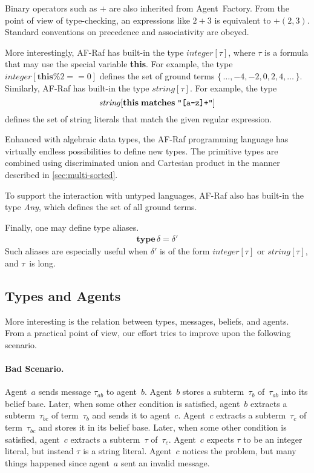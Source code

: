 \documentclass[preprint]{sigplanconf} %
\theoremstyle{remark}
\begin{document}
Binary operators such as $+$ are also inherited from Agent~Factory. From
the point of view of type-checking, an expressions like $2+3$ is equivalent
to $+(2,3)$. Standard conventions on precedence and associativity are
obeyed.

More interestingly, AF-Raf has built-in the type $\mathit{integer}[\tau]$,
where $\tau$ is a formula that may use the special variable \textbf{this}.
For example, the type $\mathit{integer}[\mathbf{this}\%2==0]$ defines the
set of ground terms $\{\,\ldots,-4,-2,0,2,4,\ldots\,\}$. Similarly, AF-Raf
has built-in the type $\mathit{string}[\tau]$. For example, the type
\[\mathit{string}[\mathbf{this}\;\mathbf{matches}\;\verb|"[a-z]+"|]\]
defines the set of string literals that match the given regular expression.

Enhanced with algebraic data types, the AF-Raf programming language has
virtually endless possibilities to define new types. The primitive types
are combined using discriminated union and Cartesian product in the manner
described in \autoref{sec:multi-sorted}.

To support the interaction with untyped languages, AF-Raf also has built-in
the type \textit{Any}, which defines the set of all ground terms.

Finally, one may define type aliases.
\begin{align}
\mathbf{type}\,\delta=\delta'
\end{align}
Such aliases are especially useful when $\delta'$ is of the form
$\mathit{integer}[\tau]$ or $\mathit{string}[\tau]$, and $\tau$~is long.

\subsection{Types and Agents}

More interesting is the relation between types, messages, beliefs, and
agents. From a practical point of view, our effort tries to improve upon
the following scenario.

\paragraph{Bad Scenario.}

Agent~$a$ sends message $\tau_{ab}$ to agent~$b$. Agent~$b$ stores a
subterm~$\tau_b$ of~$\tau_{ab}$ into its belief base. Later, when some
other condition is satisfied, agent~$b$ extracts a subterm~$\tau_{bc}$ of
term~$\tau_b$ and sends it to agent~$c$. Agent~$c$ extracts a
subterm~$\tau_c$ of term~$\tau_{bc}$ and stores it in its belief base.
Later, when some other condition is satisfied, agent~$c$ extracts a
subterm~$\tau$ of~$\tau_c$. Agent~$c$ expects $\tau$ to be an integer
literal, but instead $\tau$ is a string literal. Agent~$c$ notices the
problem, but many things happened since agent~$a$ sent an invalid message.
\end{document}
